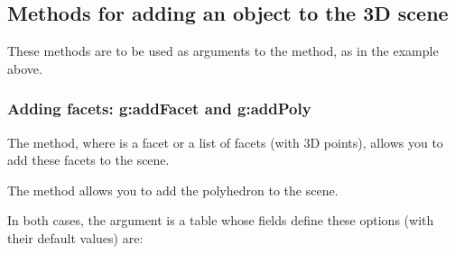 \subsection{Methods for adding an object to the 3D scene}

These methods are to be used as arguments to the  method, as in the example above.

\subsubsection{Adding facets: g:addFacet and g:addPoly}

The  method, where  is a facet or a list of facets (with 3D points), allows you to add these facets to the scene.

The  method allows you to add the polyhedron  to the scene.

In both cases, the  argument is a table whose fields define these options (with their default values) are:

